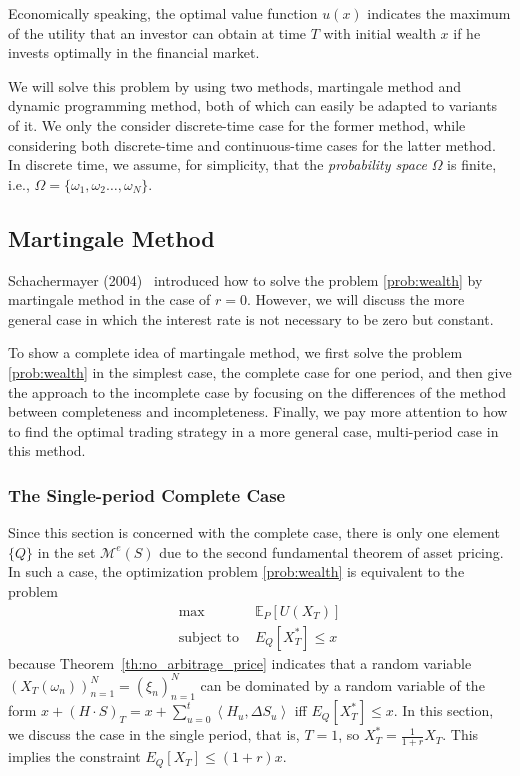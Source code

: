 \documentclass[a4paper]{article}
\theoremstyle{definition}
\numberwithin{equation}{section}
\begin{document}
Economically speaking, the optimal value function $u(x)$ indicates the maximum of the utility that an investor can obtain at time $T$ with initial wealth $x$ if he invests optimally in the financial market.

We will solve this problem by using two methods, martingale method and dynamic programming method, both of which can easily be adapted to variants of it. We only the consider discrete-time case for the former method, while considering both discrete-time and continuous-time cases for the latter method. In discrete time, we assume, for simplicity, that the \emph{probability space} $\Omega$ is finite, i.e., $\Omega=\{\omega_1,\omega_2\dots,\omega_N\}$.
\subsection{Martingale Method}\label{sec:martingale_method}
Schachermayer (2004)~\cite{book paper} introduced how to solve the problem \eqref{prob:wealth} by martingale method in the case of $r=0$. However, we will discuss the more general case in which the interest rate is not necessary to be zero but constant.

To show a complete idea of martingale method, we first solve the problem \eqref{prob:wealth} in the simplest case, the complete case for one period, and then give the approach to the incomplete case by focusing on the differences of the method between completeness and incompleteness. Finally, we pay more attention to how to find the optimal trading strategy in a more general case, multi-period case in this method.
\subsubsection{The Single-period Complete Case}
Since this section is concerned with the complete case, there is only one element $\{Q\}$ in the set $\mathcal M^e(S)$ due to the second fundamental theorem of asset pricing.
In such a case, the optimization problem \eqref{prob:wealth} is equivalent to the problem
\begin{equation}
\begin{aligned}
\max\quad&\mathbb E_P[U(X_T)]\\
\text{subject to }&E_Q[X^*_T]\leq x
\end{aligned}
\end{equation}
because Theorem~\ref{th:no_arbitrage_price} indicates that a random variable $(X_T(\omega_n))^N_{n=1}=(\xi_n)^N_{n=1}$ can be dominated by a random variable of the form $x+(H\cdot S)_T=x+\sum^t_{u=0}\left<H_u,\Delta S_u\right>$ iff $E_Q[X^*_T]\leq x$. In this section, we discuss the case in the single period, that is, $T=1$, so $X^*_T=\frac{1}{1+r}X_T$. This implies the constraint $E_Q[X_T]\leq (1+r)x$.
\end{document}
